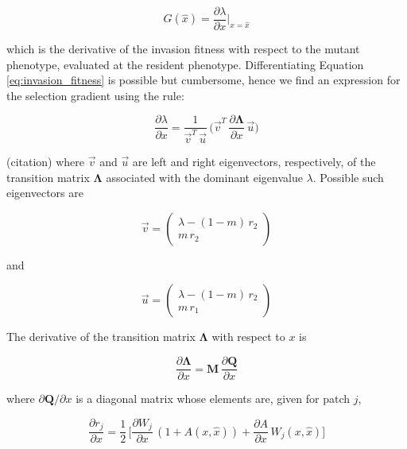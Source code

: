 \begin{equation}
    G(\hat{x}) = \frac{\partial \lambda}{\partial x}\bigg|_{x=\hat{x}}
\end{equation}

which is the derivative of the invasion fitness with respect to the mutant phenotype, evaluated at the resident phenotype. Differentiating Equation \ref{eq:invasion_fitness} is possible but cumbersome, hence we find an expression for the selection gradient using the rule:

\begin{equation}
   \frac{\partial \lambda}{\partial x}\bigg = \frac{1}{\overrightarrow{v}^T\,\overrightarrow{u}} \, \bigg( \overrightarrow{v}^T \, \frac{\partial \pmb{\Lambda}}{\partial x} \, \overrightarrow{u} \bigg)
   \label{eq:deriv_fitness}
\end{equation}

(citation) where $\overrightarrow{v}$ and $\overrightarrow{u}$ are left and right eigenvectors, respectively, of the transition matrix $\pmb{\Lambda}$ associated with the dominant eigenvalue $\lambda$. Possible such eigenvectors are

\begin{equation}
    \overrightarrow{v} = 
    \begin{pmatrix}
        \lambda - (1-m)\,r_2 \\
        m\,r_2 
    \end{pmatrix}
    \label{eq:left_eigenvector}
\end{equation}

and

\begin{equation}
    \overrightarrow{u} = 
    \begin{pmatrix}
        \lambda - (1-m)\,r_2 \\
        m\,r_1
    \end{pmatrix}
\end{equation}

The derivative of the transition matrix $\pmb\Lambda$ with respect to $x$ is

\begin{equation}
    \frac{\partial \pmb{\Lambda}}{\partial x} = \pmb{M} \, \frac{\partial \pmb{Q}}{\partial x}
\end{equation}

where $\partial \pmb{Q} / \partial x$ is a diagonal matrix whose elements are, given for patch $j$,

\begin{equation}
    \frac{\partial r_j}{\partial x} = \frac{1}{2} \, \bigg[\frac{\partial W_j}{\partial x} \, (1 + A(x, \hat{x})) + \frac{\partial A}{\partial x} \, W_j(x, \hat{x})\bigg]
    \label{eq:deriv_local_growth}
\end{equation}

